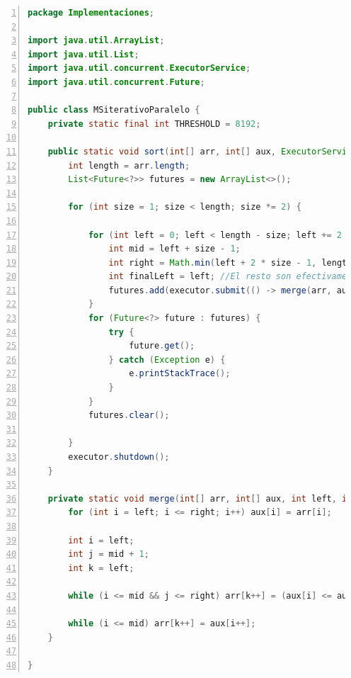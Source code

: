 \documentclass[titlepage]{article}
\begin{document}
	\begin{lstlisting}[language=java, frame=single, numbers=left, float=h]
package Implementaciones;

import java.util.ArrayList;
import java.util.List;
import java.util.concurrent.ExecutorService;
import java.util.concurrent.Future;

public class MSiterativoParalelo {
	private static final int THRESHOLD = 8192;
	
	public static void sort(int[] arr, int[] aux, ExecutorService executor) {
		int length = arr.length;
		List<Future<?>> futures = new ArrayList<>();
		
		for (int size = 1; size < length; size *= 2) {
			
			for (int left = 0; left < length - size; left += 2 * size) {
				int mid = left + size - 1;
				int right = Math.min(left + 2 * size - 1, length - 1);
				int finalLeft = left; //El resto son efectivamente finales
				futures.add(executor.submit(() -> merge(arr, aux, finalLeft, mid, right)));
			}
			for (Future<?> future : futures) {
				try {
					future.get();
				} catch (Exception e) {
					e.printStackTrace();
				}
			}
			futures.clear();
			
		}
		executor.shutdown();
	}
	
	private static void merge(int[] arr, int[] aux, int left, int mid, int right) {
		for (int i = left; i <= right; i++) aux[i] = arr[i];
		
		int i = left;       
		int j = mid + 1;    
		int k = left;       
		
		while (i <= mid && j <= right) arr[k++] = (aux[i] <= aux[j])? aux[i++] : aux[j++];
		
		while (i <= mid) arr[k++] = aux[i++];
	}
	
}
	\end{lstlisting}


\newpage
\end{document}
